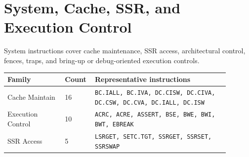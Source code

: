 \section{System, Cache, SSR, and Execution Control}
System instructions cover cache maintenance, SSR access, architectural control, fences, traps, and bring-up or debug-oriented execution controls.\par\smallskip
{\scriptsize
\begin{longtable}{@{}L{0.24\linewidth}R{0.09\linewidth}L{0.56\linewidth}@{}}
\toprule
Family & Count & Representative instructions \\
\midrule
Cache Maintain & 16 & \texttt{BC.IALL, BC.IVA, DC.CISW, DC.CIVA, DC.CSW, DC.CVA, DC.IALL, DC.ISW} \\
Execution Control & 10 & \texttt{ACRC, ACRE, ASSERT, BSE, BWE, BWI, BWT, EBREAK} \\
SSR Access & 5 & \texttt{LSRGET, SETC.TGT, SSRGET, SSRSET, SSRSWAP} \\
\bottomrule
\end{longtable}
}


\medskip

\medskip

\medskip

\medskip

\medskip

\medskip

\medskip

\medskip

\medskip

\medskip

\medskip

\medskip

\medskip

\medskip

\medskip

\medskip

\medskip

\medskip

\medskip

\medskip

\medskip

\medskip

\medskip

\medskip

\medskip

\medskip

\medskip

\medskip

\medskip

\medskip

\medskip
